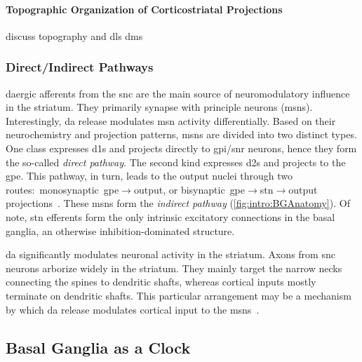 \paragraph{Topographic Organization of Corticostriatal Projections}
discuss topography and dls dms



\subsubsection{Direct/Indirect Pathways}
\label{intro:bg:pathways}
\Gls{da}ergic afferents from the \gls{snc} are the main source of neuromodulatory influence in the striatum.
They primarily synapse with principle neurons (\glspl{msn}).
Interestingly, \gls{da} release modulates \gls{msn} activity differentially.
Based on their neurochemistry and projection patterns, \glspl{msn} are divided into two distinct types.
One class expresses \glspl{d1} and projects directly to \gls{gpi}/\gls{snr} neurons, hence they form the so-called \emph{direct pathway}.
The second kind expresses \glspl{d2} and projects to the \gls{gpe}.
This pathway, in turn, leads to the output nuclei through two routes:~monosynaptic~\gls{gpe}$\rightarrow$output, or bisynaptic~\gls{gpe}$\rightarrow$\gls{stn}$\rightarrow$output projections~\cite{TURNER2000BasalFunction}.
These \glspl{msn} form the \emph{indirect pathway} (\autoref{fig:intro:BGAnatomy}).
Of note, \gls{stn} efferents form the only intrinsic excitatory connections in the basal ganglia, an otherwise inhibition-dominated structure.
\par
\Gls{da} significantly modulates neuronal activity in the striatum.
Axons from \gls{snc} neurons arborize widely in the striatum.
They mainly target the narrow necks connecting the spines to dendritic shafts, whereas cortical inputs mostly terminate on dendritic shafts.
This particular arrangement may be a mechanism by which \gls{da} release modulates cortical input to the \glspl{msn}~\cite{TURNER2000BasalFunction}.


\subsection{Basal Ganglia as a Clock}
\label{ch:intro:BGTime}

